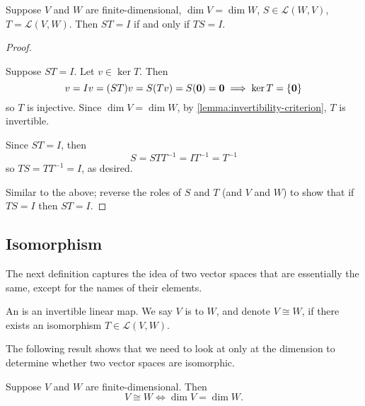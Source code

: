 \begin{corollary}
Suppose $V$ and $W$ are finite-dimensional, $\dim V=\dim W$, $S\in\mathcal{L}(W,V)$, $T=\mathcal{L}(V,W)$. Then $ST=I$ if and only if $TS=I$.
\end{corollary}

\begin{proof} \

\fbox{$\implies$} Suppose $ST=I$. Let $v\in\ker T$. Then
\[v=Iv=(ST)v=S(Tv)=S(\vb{0})=\vb{0}\implies \ker T=\{\vb{0}\}\]
so $T$ is injective. Since $\dim V=\dim W$, by \ref{lemma:invertibility-criterion}, $T$ is invertible.

Since $ST=I$, then
\[S=STT^{-1}=IT^{-1}=T^{-1}\]
so $TS=TT^{-1}=I$, as desired.

\fbox{$\impliedby$} Similar to the above; reverse the roles of $S$ and $T$ (and $V$ and $W$) to show that if $TS=I$ then $ST=I$.
\end{proof}
\pagebreak

\subsection{Isomorphism}
The next definition captures the idea of two vector spaces that are essentially the same, except for the names of their elements.

\begin{definition}[Isomorphism]
An  is an invertible linear map. 
We say $V$ is  to $W$, and denote $V\cong W$, if there exists an isomorphism $T\in\mathcal{L}(V,W)$.
\end{definition}

The following result shows that we need to look at only at the dimension to determine whether two vector spaces are isomorphic.

\begin{lemma}
Suppose $V$ and $W$ are finite-dimensional. Then
\[V\cong W\iff\dim V=\dim W.\]
\end{lemma}

